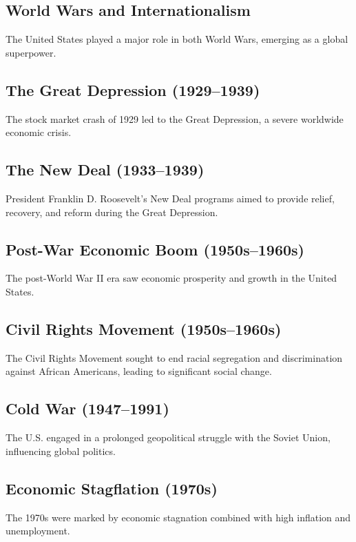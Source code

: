 \documentclass{book}
\begin{document}
\subsection{World Wars and Internationalism}
\label{subsec:world-wars-internationalism}
The United States played a major role in both World Wars, emerging as a global superpower.

\subsection{The Great Depression (1929–1939)}
\label{subsec:great-depression}
The stock market crash of 1929 led to the Great Depression, a severe worldwide economic crisis.

\subsection{The New Deal (1933–1939)}
\label{subsec:new-deal}
President Franklin D. Roosevelt's New Deal programs aimed to provide relief, recovery, and reform during the Great Depression.

\subsection{Post-War Economic Boom (1950s–1960s)}
\label{subsec:post-war-economic-boom}
The post-World War II era saw economic prosperity and growth in the United States.

\subsection{Civil Rights Movement (1950s–1960s)}
\label{subsec:civil-rights-movement}
The Civil Rights Movement sought to end racial segregation and discrimination against African Americans, leading to significant social change.

\subsection{Cold War (1947–1991)}
\label{subsec:cold-war}
The U.S. engaged in a prolonged geopolitical struggle with the Soviet Union, influencing global politics.

\subsection{Economic Stagflation (1970s)}
\label{subsec:economic-stagflation}
The 1970s were marked by economic stagnation combined with high inflation and unemployment.
\end{document}
